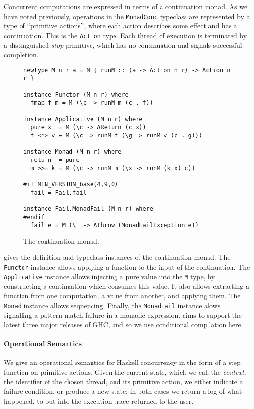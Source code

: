 Concurrent computations are expressed in terms of a continuation monad.  As we
have noted previously, operations in the \verb|MonadConc| typeclass are
represented by a type of ``primitive actions'', where each action describes some
effect and has a continuation.  This is the \verb|Action| type.  Each thread of
execution is terminated by a distinguished \emph{stop} primitive, which has no
continuation and signals successful completion.

\begin{figure}[t]
  \centering
  \begin{lstlisting}
newtype M n r a = M { runM :: (a -> Action n r) -> Action n r }

instance Functor (M n r) where
  fmap f m = M (\c -> runM m (c . f))

instance Applicative (M n r) where
  pure x  = M (\c -> AReturn (c x))
  f <*> v = M (\c -> runM f (\g -> runM v (c . g)))

instance Monad (M n r) where
  return  = pure
  m >>= k = M (\c -> runM m (\x -> runM (k x) c))

#if MIN_VERSION_base(4,9,0)
  fail = Fail.fail

instance Fail.MonadFail (M n r) where
#endif
  fail e = M (\_ -> AThrow (MonadFailException e))
  \end{lstlisting}
  \caption{The \dejafu{} continuation monad.}
  \label{fig:m}
\end{figure}

 gives the definition and typeclass instances of the \dejafu{}
continuation monad.  The \verb|Functor| instance allows applying a function to
the input of the continuation.  The \verb|Applicative| instance allows injecting
a pure value into the \verb|M| type, by constructing a continuation which
consumes this value.  It also allows extracting a function from one computation,
a value from another, and applying them.  The \verb|Monad| instance allows
sequencing.  Finally, the \verb|MonadFail| instance alows signalling a pattern
match failure in a monadic expression.  \dejafu{} aims to support the latest
three major releases of GHC, and so we use conditional compilation here.

\paragraph{Operational Semantics}
We give an operational semantics for Haskell concurrency in the form of a step
function on primitive actions.  Given the current state, which we call the
\emph{context}, the identifier of the chosen thread, and its primitive action,
we either indicate a failure condition, or produce a new state; in both cases we
return a log of what happened, to put into the execution trace returned to the
user.

